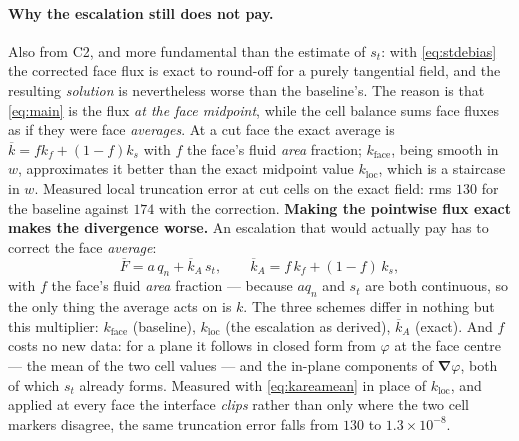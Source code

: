 \documentclass[11pt,a4paper]{article}
\newcommand{\grad}{\boldsymbol{\nabla}}
\begin{document}
\paragraph{Why the escalation still does not pay.}
Also from C2, and more fundamental than the estimate of $s_t$: with
\eqref{eq:stdebias} the corrected face flux is exact to round-off for a purely
tangential field, and the resulting \emph{solution} is nevertheless worse than
the baseline's. The reason is that \eqref{eq:main} is the flux \emph{at the
face midpoint}, while the cell balance sums face fluxes as if they were face
\emph{averages}. At a cut face the exact average is
$\overline{k}=f k_f+(1-f)k_s$ with $f$ the face's fluid \emph{area} fraction;
$k_{\text{face}}$, being smooth in $w$, approximates it better than the exact
midpoint value $k_{\text{loc}}$, which is a staircase in $w$. Measured local
truncation error at cut cells on the exact field: rms $130$ for the baseline
against $174$ with the correction. \textbf{Making the pointwise flux exact
makes the divergence worse.} An escalation that would actually pay has to
correct the face \emph{average}:
\begin{equation}
  \overline{F} = a\,q_n + \overline{k}_A\,s_t,
  \qquad
  \overline{k}_A = f\,k_f+(1-f)\,k_s ,
  \label{eq:kareamean}
\end{equation}
with $f$ the face's fluid \emph{area} fraction --- because $a q_n$ and $s_t$
are both continuous, so the only thing the average acts on is $k$. The three
schemes differ in nothing but this multiplier: $k_{\text{face}}$ (baseline),
$k_{\text{loc}}$ (the escalation as derived), $\overline{k}_A$ (exact). And
$f$ costs no new data: for a plane it follows in closed form from
$\varphi$ at the face centre --- the mean of the two cell values --- and the
in-plane components of $\grad\varphi$, both of which $s_t$ already forms.
Measured with \eqref{eq:kareamean} in place of $k_{\text{loc}}$, and applied
at every face the interface \emph{clips} rather than only where the two cell
markers disagree, the same truncation error falls from $130$ to
$1.3\times10^{-8}$.
\end{document}
